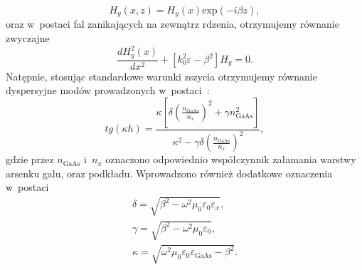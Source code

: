 \begin{equation}
	H_y(x,z)=H_y(x) \textrm{exp}(-i \beta z),
\end{equation}
oraz w~postaci fal zanikających na zewnątrz rdzenia, otrzymujemy równanie zwyczajne
\begin{equation}
	\frac{d H_y^2(x)}{dx^2} + [ k_0^2 \varepsilon - \beta^2 ] H_y = 0.
\end{equation}
Natępnie, stosując standardowe warunki zszycia otrzymujemy równanie dyspersyjne modów prowadzonych w~postaci~\cite{petykiewicz1989podstawy}:
\begin{equation}
tg( \kappa h)=\frac{\kappa [ \delta (\frac{n_{\textrm{GaAs}}}{n_x})^2 + \gamma n_{\textrm{GaAs}}^2 ]}{\kappa^2 - \gamma \delta (\frac{n_{\textrm{GaAs}}}{n_x })^2},
\label{eq:tm-disp}
\end{equation}
gdzie przez $n_{\textrm{GaAs}}$ i~$n_x$ oznaczono odpowiednio współczynnik załamania warstwy arsenku galu, oraz podkładu. Wprowadzono również dodatkowe oznaczenia w~postaci
\begin{equation}
	\begin{gathered}
		\delta=\sqrt{\beta^2-\omega^2 \mu_0 \varepsilon_0 \varepsilon_x},\\
		\gamma=\sqrt{\beta^2-\omega^2 \mu_0 \varepsilon_0},\\
		\kappa=\sqrt{\omega^2 \mu_0 \varepsilon_0 \varepsilon_{\textrm{GaAs}} - \beta^2}.
	\end{gathered}
\end{equation}

